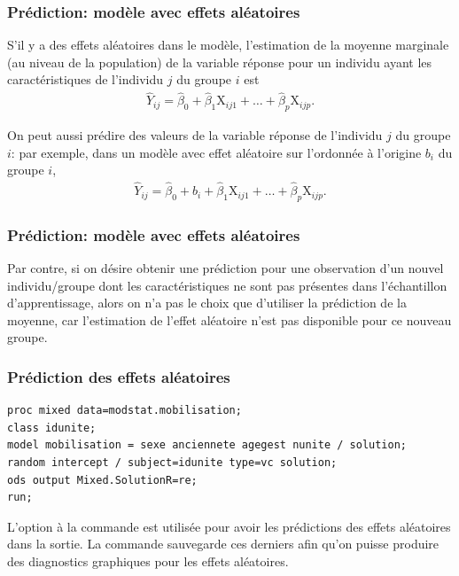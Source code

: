 \documentclass{beamer}
\begin{document}
\begin{frame}
\frametitle{Prédiction: modèle \textbf{avec} effets aléatoires}
\bi
\item S'il y a des effets aléatoires dans le modèle, l'estimation
de la \alert{moyenne marginale} (au niveau de la \alert{population}) de la variable réponse pour un individu ayant les caractéristiques de l'individu $j$ du
groupe $i$ est
\begin{align*}
\hat{Y}_{ij}=\hat{\beta}_0 + \hat{\beta}_1\mathrm{X}_{ij1} + \ldots + \hat{\beta}_p\mathrm{X}_{ijp}.
\end{align*}


\item On peut aussi prédire des
\alert{valeurs} de la variable réponse de l'individu $j$ du groupe $i$: par exemple, dans un modèle avec effet aléatoire sur l'ordonnée à l'origine $b_i$ du groupe $i$,
 \begin{align*}
\hat{Y}_{ij}=\hat{\beta}_0 +\hat{b}_{i} + \hat{\beta}_1\mathrm{X}_{ij1} + \ldots + \hat{\beta}_p\mathrm{X}_{ijp}.
\end{align*}
\ei 
\end{frame}
\begin{frame}
\frametitle{Prédiction: modèle \textbf{avec} effets aléatoires}
\bi
\item Par contre, si on désire obtenir une prédiction pour une observation d'un \alert{nouvel}
individu/groupe dont les caractéristiques ne sont pas présentes dans l'échantillon d'apprentissage, alors on n'a
pas le choix que d'utiliser la prédiction de la moyenne, car l'estimation de l'effet aléatoire n'est pas disponible pour ce nouveau groupe.
\ei
\end{frame}

\begin{frame}[fragile]
\frametitle{Prédiction des effets aléatoires}

\begin{tcolorbox}[colback=white, colframe=hecblue, title=Code \SASlang pour l'ordonnée à l'origine aléatoire]
\begin{footnotesize}
\begin{verbatim}
proc mixed data=modstat.mobilisation;
class idunite;
model mobilisation = sexe anciennete agegest nunite / solution;
random intercept / subject=idunite type=vc solution;
ods output Mixed.SolutionR=re;
run;
\end{verbatim}
\end{footnotesize}
\end{tcolorbox}
\begin{small}L'option  à la commande  est utilisée pour avoir les
prédictions des effets aléatoires dans la sortie. La commande 
sauvegarde ces derniers afin qu'on puisse produire des diagnostics graphiques pour les effets aléatoires.
\end{small}
\end{frame}
\end{document}
